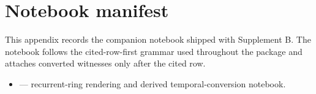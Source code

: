 \section{Notebook manifest}
This appendix records the companion notebook shipped with Supplement B. The notebook follows the cited-row-first grammar used throughout the package and attaches converted witnesses only after the cited row.\par
\begin{itemize}
\item {} --- recurrent-ring rendering and derived temporal-conversion notebook.
\end{itemize}
